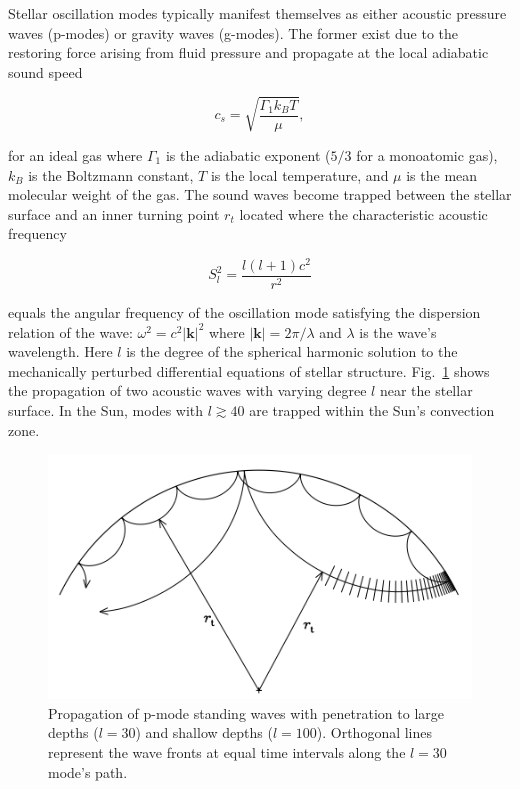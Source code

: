 Stellar oscillation modes typically 
manifest themselves as either acoustic pressure waves (p-modes) or gravity 
waves (g-modes). The former exist due to the restoring force arising from 
fluid pressure and propagate at the local adiabatic sound speed 

\begin{equation}
c_s = \sqrt{\frac{\Gamma_1 k_B T}{\mu}},
\end{equation}

\noindent for an ideal gas where $\Gamma_1$ is the adiabatic exponent ($5/3$ 
for a monoatomic gas), $k_B$ is the Boltzmann 
constant, $T$ is the local temperature, and $\mu$ is the mean molecular weight 
of the gas. The sound waves become trapped between the stellar surface and an 
inner turning point $r_t$ located where the characteristic acoustic frequency 

\begin{equation}
S_l^2 = \frac{l (l+1) c^2}{r^2} 
\end{equation}

\noindent equals the angular frequency of the oscillation mode satisfying 
the dispersion relation of the wave: $\omega^2 = c^2 |\mathbf{k}|^2$ where 
$|\mathbf{k}|=2\pi/\lambda$ and $\lambda$ is the wave's wavelength. 
Here $l$ is the degree of the spherical 
harmonic solution to the mechanically perturbed differential equations of 
stellar structure. Fig.~\ref{fig:astero} shows the propagation of 
two acoustic waves with varying degree $l$ near the stellar surface. In the 
Sun, modes with $l \gtrsim 40$ are trapped within the Sun's convection zone. \\

\begin{figure}
\centering
\includegraphics[scale=.5]{figures/asteroseismology.png}
\caption{Propagation of p-mode standing waves with penetration to large depths 
($l=30$) and shallow depths ($l=100$). Orthogonal lines represent the wave 
fronts at equal time intervals along the $l=30$ mode's path. 
\parencite[Image credit:][]{christensen14} \label{fig:astero}}
\end{figure}

